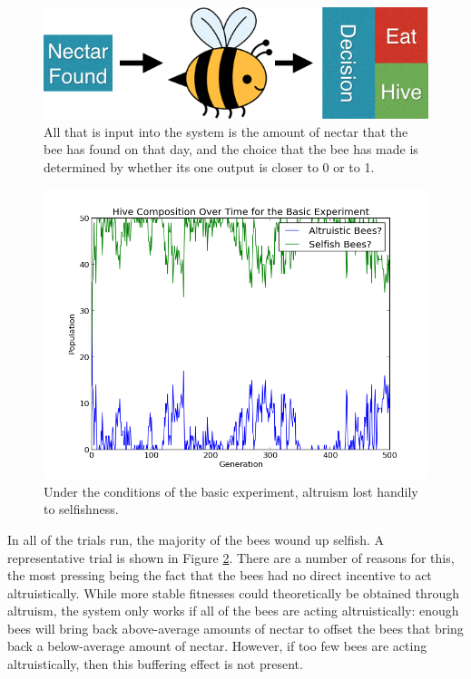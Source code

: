 \documentclass[twoside]{article}
\begin{document}
\begin{multicols}{2}
			\begin{figure}[H]
				\begin{center}
					\includegraphics[width=.4\textwidth]{bee_diagrams/naive_system.png}
				\end{center}
				\caption{All that is input into the system is the amount of nectar that the bee has found on that day, and the choice that the bee has made is determined by whether its one output is closer to 0 or to 1.}
				\label{fig:naive_system}
			\end{figure}

			\begin{figure}[H]
				\begin{center}
					\includegraphics[width=.5\textwidth]{results/basic_comp.png}
				\end{center}
				\caption{Under the conditions of the basic experiment, altruism lost handily to selfishness.}
				\label{fig:basic_experiment_composition}
			\end{figure}

			In all of the trials run, the majority of the bees wound up selfish. A representative trial is shown in Figure \ref{fig:basic_experiment_composition}. There are a number of reasons for this, the most pressing being the fact that the bees had no direct incentive to act altruistically. While more stable fitnesses could theoretically be obtained through altruism, the system only works if all of the bees are acting altruistically: enough bees will bring back above-average amounts of nectar to offset the bees that bring back a below-average amount of nectar. However, if too few bees are acting altruistically, then this buffering effect is not present. 



\end{multicols}
\end{document}

